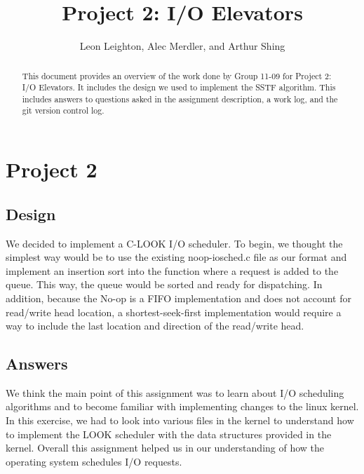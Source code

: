 \documentclass[journal, letterpaper, draftclsnofoot, onecolumn, 10pt]{IEEEtran}
\begin{document}
\title{Project 2: I/O Elevators}
\author{Leon Leighton, Alec Merdler, and Arthur Shing}

\begin{titlepage}
    \centering
    \maketitle
    \begin{abstract}
      This document provides an overview of the work done by Group 11-09 for Project 2: I/O Elevators.
      It includes the design we used to implement the SSTF algorithm.
      This includes answers to questions asked in the assignment description, a work log, and the git version control log.
    \end{abstract}


\end{titlepage}
\tableofcontents
\clearpage

\section{Project 2}

\subsection{Design}

We decided to implement a C-LOOK I/O scheduler. To begin, we thought the simplest way would be to use the existing noop-iosched.c file
as our format and implement an insertion sort into the function where a request is added to the queue. This way, the queue would be
sorted and ready for dispatching. In addition, because the No-op is a FIFO implementation and does not account for read/write head
location, a shortest-seek-first implementation would require a way to include the last location and direction of the read/write head.
 \\



\subsection{Answers}


We think the main point of this assignment was to learn about I/O scheduling algorithms and to become familiar with implementing
changes to the linux kernel. In this exercise, we had to look into various files in the kernel to understand how to implement
the LOOK scheduler with the data structures provided in the kernel. Overall this assignment helped us in our understanding of
how the operating system schedules I/O requests. \\
\end{document}

